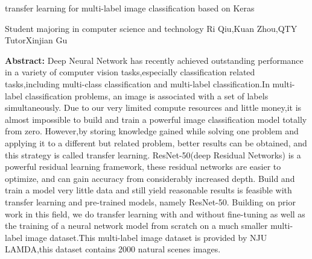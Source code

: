 
\vspace{135pt}

\begin{center}
	transfer learning for multi-label image classification based on Keras  \end{center}
\begin{center}
	 Student majoring in  computer science and technology \quad Ri Qiu,Kuan Zhou,QTY\\Tutor\quad Xinjian Gu\end{center}

{\renewcommand\baselinestretch{1}\selectfont
\noindent\textbf{Abstract: }
Deep Neural Network has recently achieved outstanding performance in a variety of computer 
vision tasks,especially classification related tasks,including multi-class classification 
 and multi-label classification.In multi-label classification problems, an image is associated 
 with a set of labels simultaneously.
Due to our very limited compute resources and little money,it is almost impossible to 
build and train a powerful image classification model totally from zero.
However,by storing knowledge gained while solving one problem and applying it to a different
but related problem, better results can be obtained, and this strategy is called transfer learning. 
ResNet-50(deep Residual Networks) is a powerful residual learning framework,
these residual networks are easier to optimize, and can gain accuracy from 
considerably increased depth. Build and train a model very little data 
and still yield reasonable results is feasible with transfer learning and pre-trained
models, namely ResNet-50.
Building on prior work in this field, we do transfer learning with and without fine-tuning 
as well as the training of a neural network model from scratch on a much smaller 
multi-label image dataset.This multi-label image dataset is provided by NJU LAMDA,this dataset 
contains 2000 natural scenes images.

}
